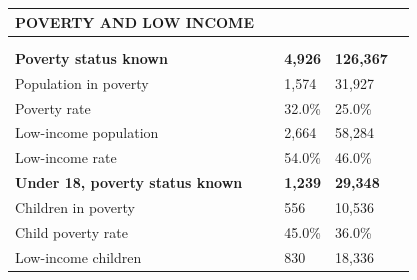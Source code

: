 \documentclass[9pt]{report}
\begin{document}
\vspace{12pt}
\setlength{\tabcolsep}{.01in} %
\begin{tabular}{p{.10in}p{.10in}p{.10in}p{3.7in}>{\hfill}p{.85in}>{\hfill}p{.85in}>{\hfill}p{.85in}>{\hfill}p{.85in}p{0.1in}}
\multicolumn{9}{l}{\parbox{7.1in}{\raggedright{\large{\strut\textbf{POVERTY AND LOW INCOME}\strut}}}} \\ 
\hline
\multicolumn{4}{l}{\parbox{3.5in}{\raggedright{\textbf{}}}} & \multicolumn{1}{r}{\parbox{.85in}{\strut\raggedleft{\textbf{}\strut}}} & \multicolumn{1}{r}{\parbox{.85in}{\strut\raggedleft{\textbf{}\strut}}} & \multicolumn{1}{r}{\parbox{.85in}{\strut{}}} & \multicolumn{1}{r}{\parbox{.85in}{\strut{}}} & \\ 
\multicolumn{9}{l}{} \\ 
\multicolumn{4}{l}{\parbox{3.5in}{\strut\raggedright{\textbf{Poverty status known}\strut}}} & \textbf{} & \textbf{} & \textbf{4,926} & \textbf{126,367} & \textbf{} \\ 
\multicolumn{4}{l}{\parbox{3.6in}{\strut\raggedright{{Population in poverty}}\strut}} &  &  & 1,574 & 31,927 & \multicolumn{1}{l}{}  \\ 
\multicolumn{4}{l}{\parbox{3.6in}{\strut\raggedright{{Poverty rate}}\strut}} &  &  & 32.0\% & 25.0\% & \multicolumn{1}{l}{}  \\ 
\multicolumn{4}{l}{\parbox{3.6in}{\strut\raggedright{{Low-income population}}\strut}} &  &  & 2,664 & 58,284 & \multicolumn{1}{l}{}  \\ 
\multicolumn{4}{l}{\parbox{3.6in}{\strut\raggedright{{Low-income rate}}\strut}} &  &  & 54.0\% & 46.0\% & \multicolumn{1}{l}{}  \\ 
\multicolumn{4}{l}{\parbox{3.5in}{\strut\raggedright{\textbf{Under 18, poverty status known}\strut}}} & \textbf{} & \textbf{} & \textbf{1,239} & \textbf{29,348} & \textbf{} \\ 
\multicolumn{4}{l}{\parbox{3.6in}{\strut\raggedright{{Children in poverty}}\strut}} &  &  & 556 & 10,536 & \multicolumn{1}{l}{}  \\ 
\multicolumn{4}{l}{\parbox{3.6in}{\strut\raggedright{{Child poverty rate}}\strut}} &  &  & 45.0\% & 36.0\% & \multicolumn{1}{l}{}  \\ 
\multicolumn{4}{l}{\parbox{3.6in}{\strut\raggedright{{Low-income children}}\strut}} &  &  & 830 & 18,336 & \multicolumn{1}{l}{}  \\ 

\end{tabular}
\end{document}
